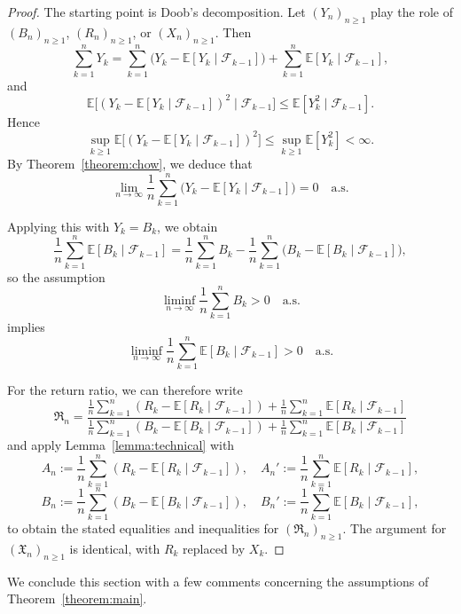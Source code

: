 \documentclass{article}
\theoremstyle{definition}
\theoremstyle{remark}
\newcommand{\E}{\mathbb{E}}
\newcommand{\F}{\mathscr{F}}
\begin{document}
\begin{proof}
The starting point is Doob’s decomposition.  Let $(Y_n)_{n\ge1}$ play the role of $(B_n)_{n\ge1}$, $(R_n)_{n\ge1}$, or $(X_n)_{n\ge1}$.  Then
\[
    \sum_{k=1}^n Y_k
    = \sum_{k=1}^n \bigl(Y_k - \E[Y_k \mid \F_{k-1}]\bigr)
      + \sum_{k=1}^n \E[Y_k \mid \F_{k-1}],
\]
and
\[
    \E\bigl[(Y_k - \E[Y_k \mid \F_{k-1}])^2\mid \F_{k-1}\bigr]
    \le \E[Y_k^2\mid \F_{k-1}].
\]
Hence
\[
\sup_{k\ge1} \E\bigl[(Y_k - \E[Y_k \mid \F_{k-1}])^2\bigr]
\le\sup_{k\ge1} \E[Y_k^2]<\infty.
\]
By Theorem~\ref{theorem:chow}, we deduce that
\[
    \lim_{n\to\infty}\frac{1}{n}\sum_{k=1}^n
    \bigl(Y_k - \E[Y_k \mid \F_{k-1}]\bigr) = 0\quad\text{a.s.}
\]

Applying this with $Y_k = B_k$, we obtain
\[
\frac{1}{n}\sum_{k=1}^n \E[B_k \mid \F_{k-1}]=\frac{1}{n}\sum_{k=1}^n B_k-\frac{1}{n}\sum_{k=1}^n \bigl(B_k - \E[B_k \mid \F_{k-1}]\bigr),
\]
so the assumption
\[
\liminf_{n\to\infty}\frac{1}{n}\sum_{k=1}^n B_k>0\quad\text{a.s.}
\]
implies
\[
\liminf_{n\to\infty}\frac{1}{n}\sum_{k=1}^n \E[B_k \mid \F_{k-1}]>0\quad\text{a.s.}
\]

For the return ratio, we can therefore write
\[
    \mathfrak{R}_n = \frac{\frac{1}{n}\sum_{k=1}^n (R_k - \E[R_k \mid \F_{k-1}])
          + \frac{1}{n}\sum_{k=1}^n \E[R_k \mid \F_{k-1}]}{\frac{1}{n}\sum_{k=1}^n (B_k - \E[B_k \mid \F_{k-1}])
          + \frac{1}{n}\sum_{k=1}^n \E[B_k \mid \F_{k-1}]}
\]
and apply Lemma~\ref{lemma:technical} with
\[
A_n := \frac{1}{n}\sum_{k=1}^n (R_k - \E[R_k \mid \F_{k-1}]),
\quad
A_n' := \frac{1}{n}\sum_{k=1}^n \E[R_k \mid \F_{k-1}],
\]
\[
B_n := \frac{1}{n}\sum_{k=1}^n (B_k - \E[B_k \mid \F_{k-1}]),
\quad
B_n' := \frac{1}{n}\sum_{k=1}^n \E[B_k \mid \F_{k-1}],
\]
to obtain the stated equalities and inequalities for $(\mathfrak{R}_n)_{n\ge1}$.  
The argument for $(\mathfrak{X}_n)_{n\ge1}$ is identical, with $R_k$ replaced by $X_k$.
\end{proof}

We conclude this section with a few comments concerning the assumptions of Theorem~\ref{theorem:main}.
\end{document}
